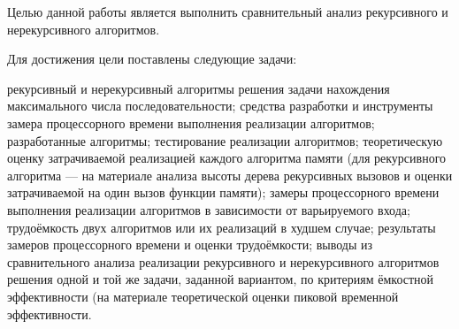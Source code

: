 
Целью данной работы является выполнить сравнительный анализ рекурсивного и нерекурсивного алгоритмов.

Для достижения цели поставлены следующие задачи:
\begin{itemize}
	 рекурсивный и нерекурсивный алгоритмы решения задачи нахождения максимального числа последовательности;
	 средства разработки и инструменты замера процессорного времени выполнения реализации алгоритмов;
	 разработанные алгоритмы;
	 тестирование реализации алгоритмов;
	 теоретическую оценку затрачиваемой реализацией каждого алгоритма памяти (для рекурсивного алгоритма — на материале анализа высоты дерева рекурсивных вызовов и оценки затрачиваемой на один вызов функции памяти);
	 замеры процессорного времени выполнения реализации алгоритмов в зависимости от варьируемого входа;
	 трудоёмкость двух алгоритмов или их реализаций в худшем случае;
	 результаты замеров процессорного времени и оценки трудоёмкости;
	 выводы из сравнительного анализа реализации рекурсивного и нерекурсивного алгоритмов решения одной и той же задачи, заданной вариантом, по критериям ёмкостной эффективности (на материале теоретической оценки пиковой временной эффективности.
\end{itemize}
\clearpage
